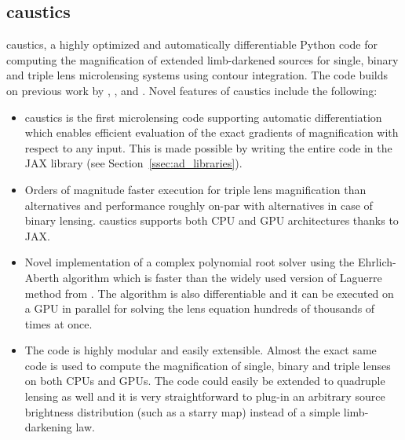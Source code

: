 \documentclass[12pt,dvipsnames]{report}
\newcommand{\ssf}[1]{\textsf{#1}}
\begin{document}
\subsection{\ssf{caustics}}

\ssf{caustics}, a highly optimized and
automatically differentiable \ssf{Python} code for computing the
magnification of extended limb-darkened sources for single, binary and triple lens
microlensing systems using contour integration. The code builds on previous work by
\citet{2021MNRAS.503.6143K}, \citet{1998A&A...333L..79D},
\citet{2007MNRAS.377.1679D} and \citet{2018MNRAS.479.5157B}.
Novel features of \ssf{caustics} include the following:
\begin{itemize}
    \item \ssf{caustics} is the first microlensing code supporting automatic
          differentiation which enables efficient evaluation of the exact gradients of
          magnification with respect to any input. This is made possible by writing the
          entire code in the \ssf{JAX} library (see Section~\ref{ssec:ad_libraries}).
    \item Orders of magnitude faster execution for triple lens magnification than
          alternatives and performance roughly on-par with alternatives in case of binary
          lensing. \ssf{caustics} supports both CPU and GPU architectures thanks to
          \ssf{JAX}.
    \item  Novel implementation of a complex polynomial root solver using the
          Ehrlich-Aberth algorithm which is faster than the widely used version of
          Laguerre method from \citet{2012arXiv1203.1034S}. The algorithm is also
          differentiable and it can be executed on a GPU in parallel for solving the lens
          equation hundreds of thousands of times at once.
    \item  The code is highly modular and easily extensible. Almost the exact same code is
          used to compute the magnification of single, binary and triple lenses on both
          CPUs and GPUs. The code could easily be extended to quadruple lensing as well
          and it is very straightforward to plug-in an arbitrary source brightness
          distribution (such as a \ssf{starry} map) instead of a simple limb-darkening
          law.
\end{itemize}
\end{document}
